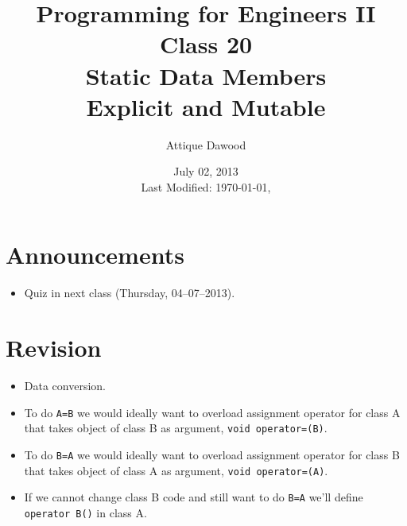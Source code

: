 \documentclass[12pt,a4paper]{article}
\title{\vspace{-2cm}Programming for Engineers II\\Class 20\\Static Data Members\\Explicit and Mutable}
\author{Attique Dawood}
\date{July 02, 2013\\[0.2cm] Last Modified: \today, \currenttime}
\begin{document}
\maketitle
\section{Announcements}
\begin{itemize}
\item Quiz in next class (Thursday, 04--07--2013).
\end{itemize}
\section{Revision}
\begin{itemize}
\item Data conversion.
\item To do \verb|A=B| we would ideally want to overload assignment operator for class A that takes object of class B as argument, \verb|void operator=(B)|.
\item To do \verb|B=A| we would ideally want to overload assignment operator for class B that takes object of class A as argument, \verb|void operator=(A)|.
\item If we cannot change class B code and still want to do \verb|B=A| we'll define \verb|operator B()| in class A.
\end{itemize}
\end{document}
